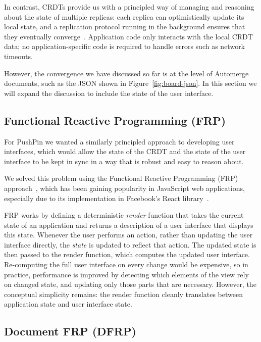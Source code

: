 \documentclass[sigplan,10pt]{acmart}
\begin{document}
In contrast, CRDTs provide us with a principled way of managing and reasoning about the state of multiple replicas: each replica can optimistically update its local state, and a replication protocol running in the background ensures that they eventually converge~\cite{Saito:2005jw}.
Application code only interacts with the local CRDT data; no application-specific code is required to handle errors such as network timeouts.

However, the convergence we have discussed so far is at the level of Automerge documents, such as the JSON shown in Figure~\ref{fig:board-json}.
In this section we will expand the discussion to include the state of the user interface.

\subsection{Functional Reactive Programming (FRP)}

For PushPin we wanted a similarly principled approach to developing user interfaces, which would allow the state of the CRDT and the state of the user interface to be kept in sync in a way that is robust and easy to reason about.

We solved this problem using the Functional Reactive Programming (FRP) approach~\cite{Czaplicki:2013ig,Mogk2018distributedRP}, which has been gaining popularity in JavaScript web applications, especially due to its implementation in Facebook's React library~\cite{React}.

FRP works by defining a deterministic \emph{render} function that takes the current state of an application and returns a description of a user interface that displays this state.
Whenever the user performs an action, rather than updating the user interface directly, the \emph{state} is updated to reflect that action.
The updated state is then passed to the render function, which computes the updated user interface.
Re-computing the full user interface on every change would be expensive, so in practice, performance is improved by detecting which elements of the view rely on changed state, and updating only those parts that are necessary.
However, the conceptual simplicity remains: the render function cleanly translates between application state and user interface state.

\subsection{Document FRP (DFRP)}
\end{document}
